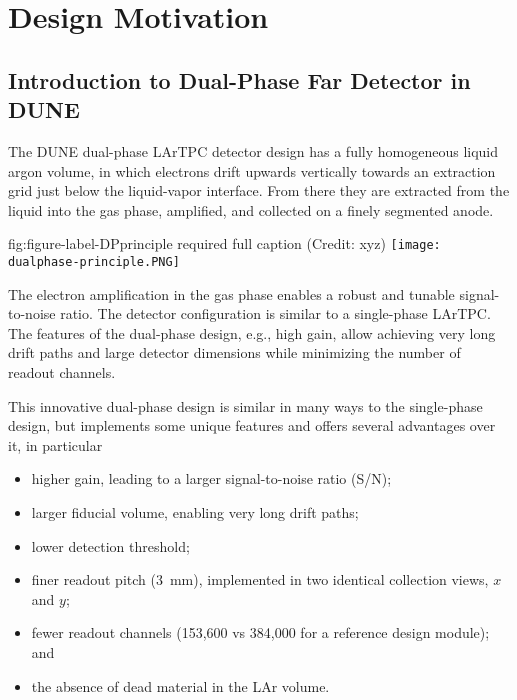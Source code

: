 \chapter{Design Motivation}
\label{ch:fddp-design}

\section{Introduction to Dual-Phase Far Detector in DUNE}
\label{sec:fddp-design-highlight}


The DUNE dual-phase LArTPC detector design 
has a fully homogeneous liquid argon volume, in which electrons
drift upwards vertically towards an extraction grid just below the liquid-vapor interface. From there they
are extracted from the liquid into the gas phase, amplified, and
collected on a finely segmented
anode.


\begin{dunefigure}{fig:figure-label-DPprinciple}
{required full caption (Credit: xyz)}
\texttt{[image: dualphase-principle.PNG]}
\end{dunefigure}

The electron amplification in the gas phase enables a robust and tunable signal-to-noise ratio. 
The detector configuration is similar to a single-phase LArTPC. The features of the dual-phase design, e.g., high gain, 
allow achieving very long drift paths and large detector dimensions while minimizing the number of readout channels.


This innovative dual-phase design is similar in many ways to the single-phase design,
but implements some unique features and offers several advantages over it, in particular
\begin{itemize}
\item  higher gain, leading to a larger signal-to-noise ratio (S/N);
\item  larger fiducial volume, enabling very long drift paths;
\item  lower detection threshold;
\item  finer readout pitch (3~mm), implemented in two identical collection views, $x$ and $y$;
\item  fewer readout channels (153,600 vs 384,000 for a reference design  module); and
\item  the absence of dead material in the LAr volume.
\end{itemize}

